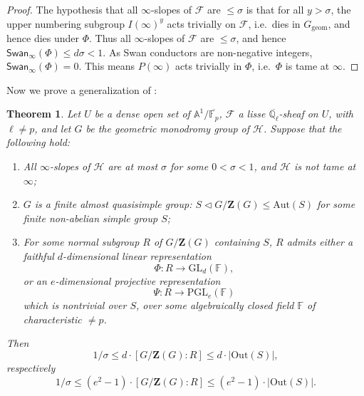 \documentclass[11pt]{amsart}
\theoremstyle{plain}
\newtheorem{thm}{Theorem}
\theoremstyle{definition}
\numberwithin{thm}{section}
\numberwithin{equation}{thm}
\newcommand{\Aut}{\mathrm{Aut}}
\newcommand{\Out}{\mathrm{Out}}
\newcommand{\Swan}{\mathsf {Swan}}
\newcommand{\GL}{\mathrm{GL}}
\newcommand{\PGL}{\mathrm{PGL}}
\newcommand{\sF}{{\mathcal F}}
\newcommand{\sH}{{\mathcal H}}
\newcommand{\A}{{\mathbb A}}
\newcommand{\F}{{\mathbb F}}
\newcommand{\G}{{\mathbb G}}
\newcommand{\Q}{{\mathbb Q}}
\newcommand{\0}{\emptyset}
\newcommand{\ZB}{{\mathbf Z}}
\newcommand{\geo}{{\mathrm {geom}}}
\begin{document}
\begin{proof}
The hypothesis that all $\infty$-slopes of $\sF$ are $\le \sigma$ is that for all $y > \sigma$, the upper numbering subgroup $I(\infty)^y$ acts trivially on $\sF$, i.e.\ dies in $G_{\geo}$, and hence dies under $\Phi$. Thus all $\infty$-slopes of $\sF$ are $\le \sigma$, and hence
$\Swan_\infty(\Phi) \le d\sigma <1$. As
Swan conductors are non-negative integers, 
$\Swan_\infty(\Phi) = 0$. This means $P(\infty)$ acts trivially in $\Phi$, 
i.e.\ $\Phi$ is tame at $\infty$.
\end{proof}



Now we prove a generalization of  \cite[Theorem 4.16]{KT5}:

\begin{thm}\label{bound}
Let $U$ be a dense open set of $\A^1/\overline{\F_p}$, $\sF$ a lisse $\overline{\Q_\ell}$-sheaf on $U$, with $\ell \neq p$,
and let $G$ be the geometric monodromy group
of $\sH$. Suppose that the following hold:
\begin{enumerate}[\rm(a)]
\item All $\infty$-slopes of $\sH$ are at most $\sigma$ for some $0 < \sigma < 1$, and $\sH$ is not tame at $\infty$; 
\item $G$ is a finite almost quasisimple group: $S \lhd G/\ZB(G) \leq \Aut(S)$ for some finite non-abelian simple group $S$;
\item For some normal subgroup $R$ of $G/\ZB(G)$ containing $S$, $R$ admits either a faithful $d$-dimensional linear representation 
$$\Phi:R \to \GL_d(\F),$$ 
or an $e$-dimensional projective representation 
$$\Psi:R \to \PGL_e(\F)$$
which is nontrivial over $S$, 
over some algebraically closed field $\F$ of characteristic $\neq p$.
\end{enumerate}
Then %
$$1/\sigma \leq d\cdot [G/\ZB(G):R] \leq d\cdot|\Out(S)|,$$
respectively
$$1/\sigma \leq (e^2-1) \cdot [G/\ZB(G):R] \leq (e^2-1)\cdot|\Out(S)|.$$
\end{thm}
\end{document}
